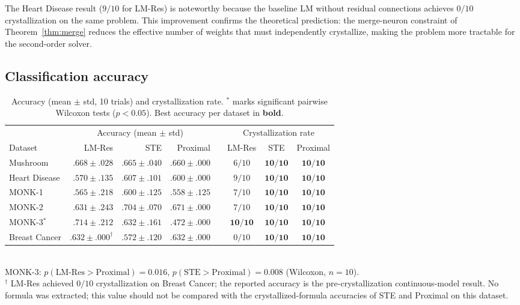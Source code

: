 \documentclass[12pt,a4paper]{article}
\begin{document}
The Heart Disease result ($9/10$ for LM-Res) is noteworthy because the
baseline LM without residual connections achieves $0/10$ crystallization on
the same problem.
This improvement confirms the theoretical prediction: the merge-neuron
constraint of Theorem~\ref{thm:merge} reduces the effective number of weights
that must independently crystallize, making the problem more tractable for
the second-order solver.

\subsection{Classification accuracy}
\label{ssec:accuracy}

\begin{table}[h]
\centering
\caption{Accuracy (mean $\pm$ std, 10 trials) and crystallization rate.
$^{\ast}$ marks significant pairwise Wilcoxon tests ($p < 0.05$).
Best accuracy per dataset in \textbf{bold}.}
\label{tab:acc}
\setlength{\tabcolsep}{4.5pt}
\begin{tabular}{l rrr c ccc}
\toprule
 & \multicolumn{3}{c}{Accuracy (mean $\pm$ std)} & &
   \multicolumn{3}{c}{Crystallization rate} \\
\cmidrule(lr){2-4}\cmidrule(lr){6-8}
Dataset & LM-Res & STE & Proximal & & LM-Res & STE & Proximal \\
\midrule
Mushroom
  & $\mathbf{.668 \pm .028}$
  & $.665 \pm .040$
  & $.660 \pm .000$
  &
  & $6/10$ & $\mathbf{10/10}$ & $\mathbf{10/10}$ \\
Heart Disease
  & $.570 \pm .135$
  & $\mathbf{.607 \pm .101}$
  & $.600 \pm .000$
  &
  & $9/10$ & $\mathbf{10/10}$ & $\mathbf{10/10}$ \\
MONK-1
  & $.565 \pm .218$
  & $\mathbf{.600 \pm .125}$
  & $.558 \pm .125$
  &
  & $7/10$ & $\mathbf{10/10}$ & $\mathbf{10/10}$ \\
MONK-2
  & $.631 \pm .243$
  & $\mathbf{.704 \pm .070}$
  & $.671 \pm .000$
  &
  & $7/10$ & $\mathbf{10/10}$ & $\mathbf{10/10}$ \\
MONK-3$^{\ast}$
  & $\mathbf{.714 \pm .212}$
  & $.632 \pm .161$
  & $.472 \pm .000$
  &
  & $\mathbf{10/10}$ & $\mathbf{10/10}$ & $\mathbf{10/10}$ \\
Breast Cancer
  & $\mathbf{.632 \pm .000}^{\dagger}$
  & $.572 \pm .120$
  & $\mathbf{.632 \pm .000}$
  &
  & $0/10$ & $\mathbf{10/10}$ & $\mathbf{10/10}$ \\
\bottomrule
\end{tabular}
\smallskip\\
{\footnotesize MONK-3: $p(\text{LM-Res} > \text{Proximal}) = 0.016$,
$p(\text{STE} > \text{Proximal}) = 0.008$ (Wilcoxon, $n = 10$).\\
$^{\dagger}$ LM-Res achieved $0/10$ crystallization on Breast Cancer;
the reported accuracy is the pre-crystallization continuous-model result.
No formula was extracted; this value should not be compared with the
crystallized-formula accuracies of STE and Proximal on this dataset.}
\end{table}
\end{document}
